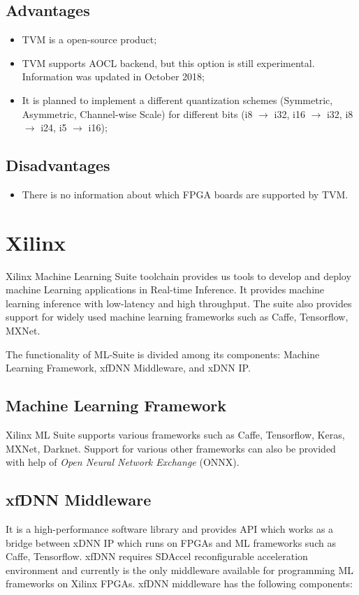 \documentclass[titlepage]{report}
\begin{document}
 \subsection{Advantages}
 \begin{itemize}
 \item TVM is a open-source product;
 \item TVM supports AOCL backend, but this option is still experimental. Information was updated in October 2018;
  \item It is planned to implement a different quantization schemes (Symmetric, Asymmetric, Channel-wise Scale) for different bits (i8 $\to$ i32, i16 $\to$ i32, i8 $\to$ i24, i5 $\to$ i16);
 \end{itemize}

 \subsection{Disadvantages}
 \begin{itemize}
 \item There is no information about which FPGA boards are supported by TVM.
 \end{itemize}

\section{Xilinx}
Xilinx Machine Learning Suite toolchain provides us tools to develop and deploy machine Learning applications in Real-time Inference. It provides machine learning inference with low-latency and high throughput. The suite also provides support for widely used machine learning frameworks such as Caffe, Tensorflow, MXNet.

The functionality of ML-Suite is divided among its components: Machine Learning Framework, xfDNN Middleware, and xDNN IP.

\subsection{Machine Learning Framework}
Xilinx ML Suite supports various frameworks such as Caffe, Tensorflow, Keras, MXNet, Darknet. Support for various other frameworks can also be provided with help of \textit{Open Neural Network Exchange} (ONNX).

\subsection{xfDNN Middleware}
It is a high-performance software library and provides API which works as a bridge between xDNN IP which runs on FPGAs and ML frameworks such as Caffe, Tensorflow. xfDNN requires SDAccel reconfigurable acceleration environment and currently is the only middleware available for programming ML frameworks on Xilinx FPGAs. xfDNN middleware has the following components:
\end{document}
